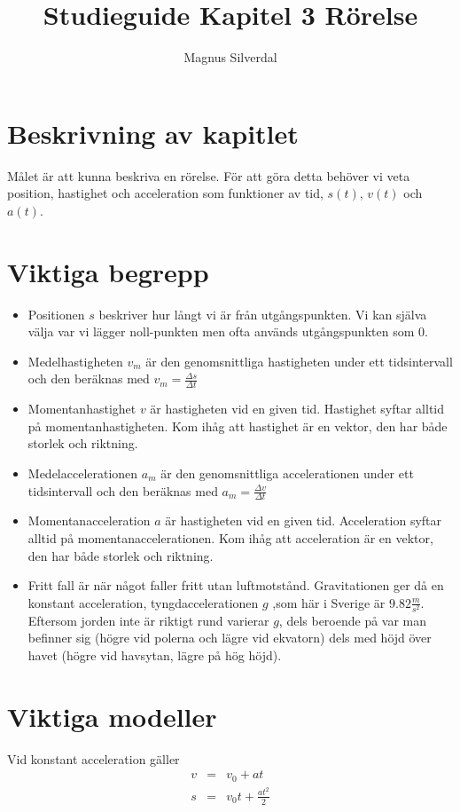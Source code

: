 \documentclass[11pt]{article}
\title{Studieguide Kapitel 3 Rörelse}
\author{Magnus Silverdal}
\begin{document}
    \maketitle
    \section{Beskrivning av kapitlet}
    Målet är att kunna beskriva en rörelse. För att göra detta behöver vi veta position, hastighet och acceleration som
    funktioner av tid, $s(t)$, $v(t)$ och $a(t)$.
    \section{Viktiga begrepp}
    \begin{itemize}
        \item Positionen $s$ beskriver hur långt vi är från utgångspunkten. Vi kan själva välja var vi lägger noll-punkten
        men ofta används utgångspunkten som 0.
        \item Medelhastigheten $v_m$ är den genomsnittliga hastigheten under ett tidsintervall och den beräknas med
        $v_m=\frac{\Delta s}{\Delta t}$
        \item Momentanhastighet $v$ är hastigheten vid en given tid. Hastighet syftar alltid på momentanhastigheten.
        Kom ihåg att hastighet är en vektor, den har både storlek och riktning.
        \item Medelaccelerationen $a_m$ är den genomsnittliga accelerationen under ett tidsintervall och den beräknas med
        $a_m=\frac{\Delta v}{\Delta t}$
        \item Momentanacceleration $a$ är hastigheten vid en given tid. Acceleration syftar alltid på momentanaccelerationen.
        Kom ihåg att acceleration är en vektor, den har både storlek och riktning.
        \item Fritt fall är när något faller fritt utan luftmotstånd. Gravitationen ger då en konstant acceleration,
        tyngdaccelerationen $g$ ,som här i Sverige är $9.82 \frac{m}{s^2}$. Eftersom jorden inte är riktigt rund varierar $g$,
        dels beroende på var man befinner sig (högre vid polerna och lägre vid ekvatorn) dels med höjd över havet (högre vid
        havsytan, lägre på hög höjd).
    \end{itemize}
    \section{Viktiga modeller}
    Vid konstant acceleration gäller
    \begin{eqnarray}
        v&=&v_0+at \\
        s&=&v_0 t +  \frac{at^2}{2}
    \end{eqnarray}
\end{document}
